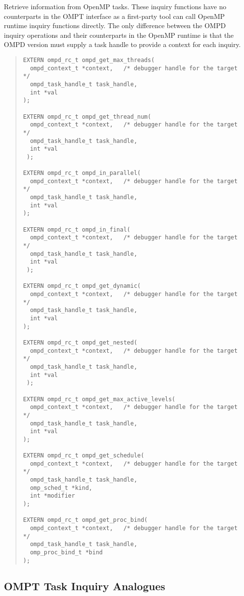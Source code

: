 \documentclass{article}
\begin{document}
Retrieve information from OpenMP tasks. These inquiry functions have no counterparts in the OMPT interface as a first-party tool can call OpenMP runtime inquiry functions directly.
The only difference between the OMPD inquiry operations and their counterparts in the OpenMP runtime is that the OMPD version must supply a task handle to provide a context for each inquiry.
 
 \begin{quote}
\begin{verbatim}
EXTERN ompd_rc_t ompd_get_max_threads(
  ompd_context_t *context,   /* debugger handle for the target */
  ompd_task_handle_t task_handle, 
  int *val
); 

EXTERN ompd_rc_t ompd_get_thread_num(
  ompd_context_t *context,   /* debugger handle for the target */
  ompd_task_handle_t task_handle, 
  int *val
 ); 
 
EXTERN ompd_rc_t ompd_in_parallel(
  ompd_context_t *context,   /* debugger handle for the target */
  ompd_task_handle_t task_handle, 
  int *val
); 

EXTERN ompd_rc_t ompd_in_final(
  ompd_context_t *context,   /* debugger handle for the target */
  ompd_task_handle_t task_handle, 
  int *val
 ); 
 
EXTERN ompd_rc_t ompd_get_dynamic(
  ompd_context_t *context,   /* debugger handle for the target */
  ompd_task_handle_t task_handle, 
  int *val
);  

EXTERN ompd_rc_t ompd_get_nested(
  ompd_context_t *context,   /* debugger handle for the target */
  ompd_task_handle_t task_handle, 
  int *val
 );
 
EXTERN ompd_rc_t ompd_get_max_active_levels(
  ompd_context_t *context,   /* debugger handle for the target */
  ompd_task_handle_t task_handle, 
  int *val
);

EXTERN ompd_rc_t ompd_get_schedule(
  ompd_context_t *context,   /* debugger handle for the target */
  ompd_task_handle_t task_handle, 
  omp_sched_t *kind, 
  int *modifier
); 

EXTERN ompd_rc_t ompd_get_proc_bind(
  ompd_context_t *context,   /* debugger handle for the target */
  ompd_task_handle_t task_handle, 
  omp_proc_bind_t *bind
); 
\end{verbatim}
\end{quote}

\subsection{OMPT Task Inquiry Analogues}
\end{document}
